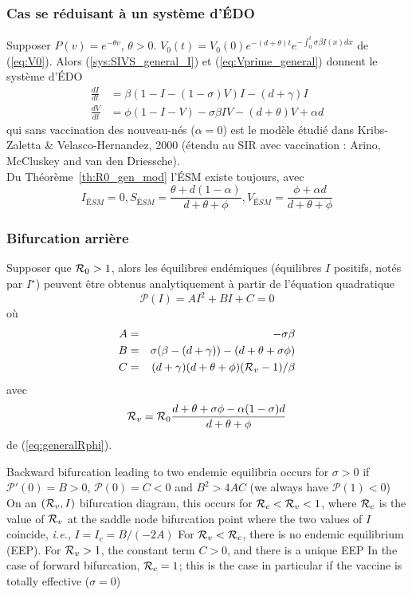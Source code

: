 \documentclass[aspectratio=169]{beamer}\usepackage[]{graphicx}\usepackage[]{xcolor}
\begin{document}
\begin{frame}\frametitle{Cas se réduisant à un système d'ÉDO}
Supposer $P(v)=e^{-\theta v}$, $\theta>0$.
$V_0(t)=V_0(0)e^{-(d+\theta)t}e^{-\int_0^t\sigma\beta I(x)dx}$ de
(\ref{eq:V0}). Alors (\ref{sys:SIVS_general_I}) et
(\ref{eq:Vprime_general}) donnent le système d'ÉDO
\begin{subequations}\label{ODEmodel}
\begin{align}
\frac{dI}{dt}&= \beta(1-I-(1-\sigma)V)I-(d+\gamma)I
\label{ODEmodelI}\\
\frac{dV}{dt}&= \phi(1-I-V)-\sigma\beta IV -(d+\theta)V+\alpha d
\label{ODEmodelV}
\end{align}
\end{subequations}
qui sans vaccination des nouveau-nés ($\alpha=0$) est le modèle étudié dans
Kribs-Zaletta \& Velasco-Hernandez, 2000 (étendu au SIR avec
vaccination : Arino,
McCluskey and van den Driessche).\\[0.2cm]

Du Théorème~\ref{th:R0_gen_mod} l'ÉSM existe toujours, avec
\[
I_{ÉSM}=0,
S_{ÉSM}=\frac{\theta+d(1-\alpha)}{d+\theta+\phi},
V_{ÉSM}=\frac{\phi+\alpha d}{d+\theta+\phi}
\]
\end{frame}



\begin{frame}\frametitle{Bifurcation arrière}
Supposer que $\mathcal{R}_0>1$, alors les équilibres endémiques (équilibres $I$
positifs, notés
par $I^\star$) peuvent être obtenus analytiquement à partir de l'équation quadratique
\[
\mathcal{P} (I)=AI^2+BI+C=0
\]
où
\begin{eqnarray*}
A&=& -\sigma\beta \\
B&=& \sigma(\beta-(d+\gamma))-(d+\theta+\sigma\phi)\\
C&=& (d+\gamma)(d+\theta+\phi)(\mathcal{R}_v-1)/\beta
\end{eqnarray*}
avec
\[
\mathcal{R}_v=\mathcal{R}_0\frac{d+\theta+\sigma\phi-\alpha(1-\sigma)d}{d+\theta+\phi}
\]
de  (\ref{eq:generalRphi}).
\end{frame}

\begin{frame}
Backward bifurcation leading to two endemic
equilibria occurs for $\sigma>0$ if $ \mathcal{P}'(0)=B>0$,
$\mathcal{P}(0)=C<0$ and $B^2>4AC$ (we always have
$\mathcal{P}(1)<0$)
\vfill
\bbullet
On an $(\mathcal{R}_v,I)$ bifurcation diagram, this occurs for
$\mathcal{R}_c<\mathcal{R}_v<1$, where $\mathcal{R}_c$ is the value of $\mathcal{R}_v$ at
the saddle node bifurcation point where the two values of $I$ coincide,
\emph{i.e.}, $I=I_c=B/(-2A)$
\vfill
\bbullet
For $\mathcal{R}_v<\mathcal{R}_c$, there is no endemic equilibrium (EEP).
For $\mathcal{R}_v>1$, the constant term $C>0$, and there is a unique EEP
\vfill
\bbullet
In the case of forward bifurcation, $\mathcal{R}_c=1$; this is the case in
particular if the vaccine is totally effective ($\sigma=0$)
\end{frame}
\end{document}
